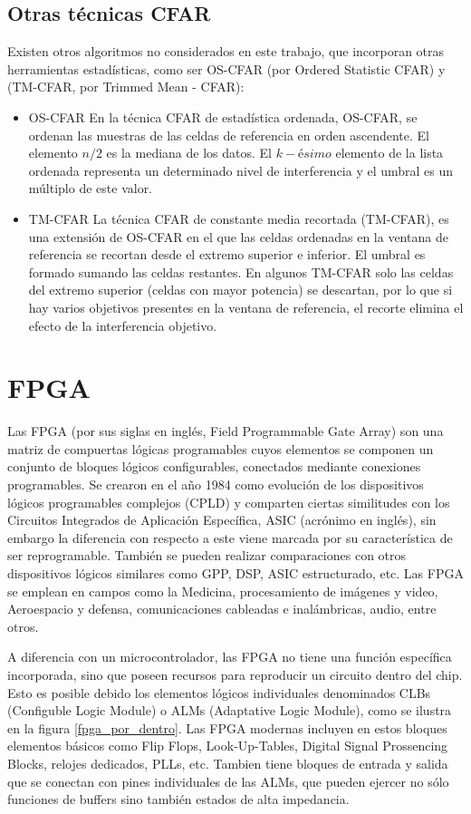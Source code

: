 \subsection{Otras técnicas CFAR}
Existen otros algoritmos no considerados en este trabajo, que incorporan otras herramientas estadísticas, como ser OS-CFAR (por Ordered Statistic CFAR) y (TM-CFAR, por Trimmed Mean - CFAR):
\begin{itemize}
\item OS-CFAR
En la técnica CFAR de estadística ordenada, OS-CFAR, se ordenan las muestras de las celdas de referencia en orden ascendente. El elemento \(n/2\) es la mediana de los datos. El \(k-ésimo\) elemento de la lista ordenada representa un determinado nivel de interferencia y el umbral es un múltiplo de este valor.
\item TM-CFAR
La técnica CFAR de constante media recortada (TM-CFAR), es una extensión de OS-CFAR en el que las celdas ordenadas en la ventana de referencia se recortan desde el extremo superior e inferior. El umbral es formado sumando las celdas restantes. En algunos TM-CFAR solo las celdas del extremo superior (celdas con mayor potencia) se descartan, por lo que si hay varios objetivos presentes en la ventana de referencia, el recorte elimina el efecto de la interferencia
objetivo.

\end{itemize}


\section{FPGA}

Las FPGA (por sus siglas en inglés, Field Programmable Gate Array) son una matriz de compuertas lógicas programables cuyos elementos se componen un conjunto de bloques lógicos configurables, conectados mediante conexiones programables. Se crearon en el año 1984 como evolución de los dispositivos lógicos programables complejos (CPLD) y comparten ciertas similitudes con los Circuitos Integrados de Aplicación Específica, ASIC (acrónimo en inglés), sin embargo la diferencia con respecto a este viene marcada por su característica de ser reprogramable. También se pueden realizar comparaciones con otros dispositivos lógicos similares como GPP, DSP, ASIC estructurado, etc. Las FPGA se emplean en campos como la Medicina, procesamiento de imágenes y video, Aeroespacio y defensa, comunicaciones cableadas e inalámbricas, audio, entre otros.

A diferencia con un microcontrolador, las FPGA no tiene una función específica incorporada, sino que poseen recursos para reproducir un circuito dentro del chip. Esto es posible debido los elementos lógicos individuales denominados CLBs (Configuble Logic Module) o  ALMs (Adaptative Logic Module), como se ilustra en la figura \ref{fpga_por_dentro}. Las FPGA modernas incluyen en estos bloques elementos básicos como Flip Flops, Look-Up-Tables, Digital Signal Prossencing Blocks, relojes dedicados, PLLs, etc. Tambien tiene bloques de entrada y salida que se conectan con pines individuales de las ALMs, que pueden ejercer no sólo funciones de buffers sino también estados de alta impedancia.

